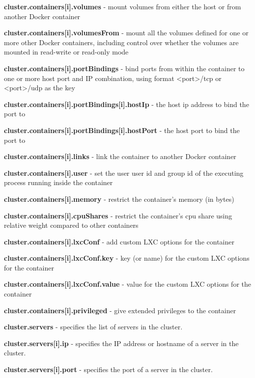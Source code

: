 \documentclass[a4paper,11pt,twoside]{report}
\begin{document}
\begin{list}{-}{}
  \item\textbf{{cluster.containers[i].volumes}} - mount volumes from either the host or from another Docker container
  \item\textbf{{cluster.containers[i].volumesFrom}} - mount all the volumes defined for one or more other Docker containers, including control over whether the volumes are mounted in read-write or read-only mode
  \item\textbf{{cluster.containers[i].portBindings}} - bind ports from within the container to one or more host port and IP combination, using format <port>/tcp or <port>/udp as the key
  \item\textbf{{cluster.containers[i].portBindings[i].hostIp}} - the host ip address to bind the port to
  \item\textbf{{cluster.containers[i].portBindings[i].hostPort}} - the host port to bind the port to
  \item\textbf{{cluster.containers[i].links}} - link the container to another Docker container
  \item\textbf{{cluster.containers[i].user}} - set the user user id and group id of the executing process running inside the container
  \item\textbf{{cluster.containers[i].memory}} - restrict the container's memory (in bytes)
  \item\textbf{{cluster.containers[i].cpuShares}} - restrict the container's cpu share using relative weight compared to other containers
  \item\textbf{{cluster.containers[i].lxcConf}} - add custom LXC options for the container
  \item\textbf{{cluster.containers[i].lxcConf.key}} - key (or name) for the custom LXC options for the container
  \item\textbf{{cluster.containers[i].lxcConf.value}} - value for the custom LXC options for the container
  \item\textbf{{cluster.containers[i].privileged}} - give extended privileges to the container
  
  \item\textbf{{cluster.servers}} - specifies the list of servers in the cluster.
  
  \item\textbf{{cluster.servers[i].ip}} - specifies the IP address or hostname of a server in the cluster.
  
  \item\textbf{{cluster.servers[i].port}} - specifies the port of a server in the cluster.
  

\end{list}
\end{document}
